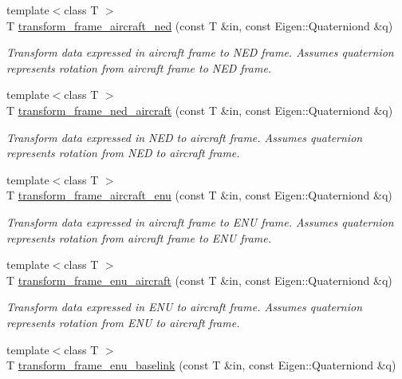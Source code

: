 \begin{DoxyCompactItemize}
{\footnotesize template$<$class T $>$ }\\T \mbox{\hyperlink{group__nodelib_gaabef5de6c7b391794c35c75dd1232194}{transform\+\_\+frame\+\_\+aircraft\+\_\+ned}} (const T \&in, const Eigen\+::\+Quaterniond \&q)
\begin{DoxyCompactList}\small\item\em Transform data expressed in aircraft frame to N\+ED frame. Assumes quaternion represents rotation from aircraft frame to N\+ED frame. \end{DoxyCompactList}\item 
{\footnotesize template$<$class T $>$ }\\T \mbox{\hyperlink{group__nodelib_ga916fb57c10ef6a7109585245f512d4b2}{transform\+\_\+frame\+\_\+ned\+\_\+aircraft}} (const T \&in, const Eigen\+::\+Quaterniond \&q)
\begin{DoxyCompactList}\small\item\em Transform data expressed in N\+ED to aircraft frame. Assumes quaternion represents rotation from N\+ED to aircraft frame. \end{DoxyCompactList}\item 
{\footnotesize template$<$class T $>$ }\\T \mbox{\hyperlink{group__nodelib_ga501a41c3a2de7186f4ed602a0399a75b}{transform\+\_\+frame\+\_\+aircraft\+\_\+enu}} (const T \&in, const Eigen\+::\+Quaterniond \&q)
\begin{DoxyCompactList}\small\item\em Transform data expressed in aircraft frame to E\+NU frame. Assumes quaternion represents rotation from aircraft frame to E\+NU frame. \end{DoxyCompactList}\item 
{\footnotesize template$<$class T $>$ }\\T \mbox{\hyperlink{group__nodelib_ga669df732714ea8b69f228efba9f05dbb}{transform\+\_\+frame\+\_\+enu\+\_\+aircraft}} (const T \&in, const Eigen\+::\+Quaterniond \&q)
\begin{DoxyCompactList}\small\item\em Transform data expressed in E\+NU to aircraft frame. Assumes quaternion represents rotation from E\+NU to aircraft frame. \end{DoxyCompactList}\item 
{\footnotesize template$<$class T $>$ }\\T \mbox{\hyperlink{group__nodelib_ga2f2546cf431334a76e19fdd3800f286d}{transform\+\_\+frame\+\_\+enu\+\_\+baselink}} (const T \&in, const Eigen\+::\+Quaterniond \&q)

\end{DoxyCompactItemize}
